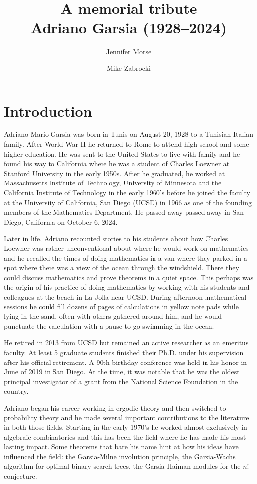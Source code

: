 \documentclass{notices}
\title{
A memorial tribute
\\ Adriano Garsia (1928--2024)
}
\author{
  Jennifer Morse
  \affil{
    The first author is a professor of mathematics at a University of Virginia.
    Her email address is {\tt morsej@virginia.edu}.
    }
  \and
  Mike Zabrocki
  \affil{
    The second author is a professor of mathematics at York University in
    Toronto, Canada.  His email address is {\tt zabrocki@yorku.ca}.
   }
}
\begin{document}
\maketitle

\section*{Introduction}

Adriano Mario Garsia was born in Tunis on August 20, 1928 to a Tunisian-Italian family.  After World War II he returned to Rome to attend high school and some higher education.  He was sent to the United States to live with family and he found his way to California where he was a student of Charles Loewner at Stanford University in the early 1950s.  After he graduated, he worked at Massachusetts Institute of Technology, University of Minnesota and the California Institute of Technology in the early 1960's before he joined the faculty at the University of California, San Diego (UCSD) in 1966 as one of the founding members of the Mathematics Department.  He passed away passed away in San Diego, California on October 6, 2024.

Later in life, Adriano recounted stories to his students about how Charles Loewner was rather unconventional about where he would work on mathematics and he recalled the times of doing mathematics in a van where they parked in a spot where there was a view of the ocean through the windshield.  There they could discuss mathematics and prove theorems in a quiet space.  This perhaps was the origin of his practice of doing mathematics by working with his students and colleagues at the beach in La Jolla near UCSD.  During afternoon mathematical sessions he could fill dozens of pages of calculations in yellow note pads while lying in the sand, often with others gathered around him, and he would punctuate the calculation with a pause to go swimming in the ocean.

He retired in 2013 from UCSD but remained an active researcher as an emeritus faculty.  At least 5 graduate students finished their Ph.D. under his supervision after his official retirement.  A 90th birthday conference was held in his honor in June of 2019 in San Diego.  At the time, it was notable that he was the oldest principal investigator of a grant from the National Science Foundation in the country.

Adriano began his career working in ergodic theory and then switched to probability theory and he made several important contributions to the literature in both those fields.  Starting in the early 1970's he worked almost exclusively in algebraic
combinatorics and this has been the field where he has made his most lasting impact.  Some theorems that bare his name hint at how his ideas have influenced the field: the Garsia-Milne involution principle, the Garsia-Wachs algorithm for optimal binary search trees, the Garsia-Haiman modules for the $n!$-conjecture.
\end{document}
